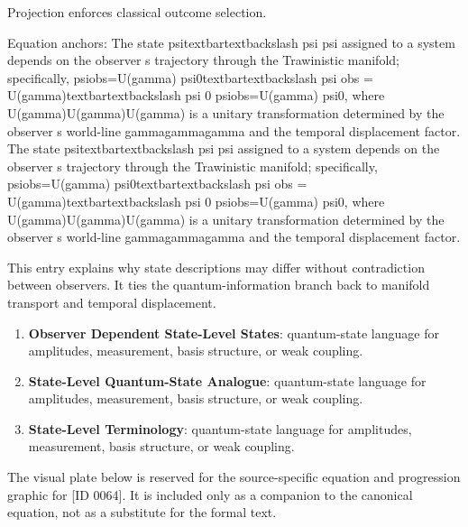 Projection enforces classical outcome selection.

Equation anchors: The state  psitextbartextbackslash psi psi assigned to a system depends on the observer s trajectory through the Trawinistic manifold; specifically,  psiobs=U(gamma) psi0textbartextbackslash psi obs = U(gamma)textbartextbackslash psi 0 psiobs=U(gamma) psi0, where U(gamma)U(gamma)U(gamma) is a unitary transformation determined by the observer s world-line gammagammagamma and the temporal displacement factor. The state  psitextbartextbackslash psi psi assigned to a system depends on the observer s trajectory through the Trawinistic manifold; specifically,  psiobs=U(gamma) psi0textbartextbackslash psi obs = U(gamma)textbartextbackslash psi 0 psiobs=U(gamma) psi0, where U(gamma)U(gamma)U(gamma) is a unitary transformation determined by the observer s world-line gammagammagamma and the temporal displacement factor.

This entry explains why state descriptions may differ without contradiction between observers. It ties the quantum-information branch back to manifold transport and temporal displacement.
\endgroup

\begingroup\footnotesize\sloppy
\begin{enumerate}[leftmargin=1.35em,itemsep=1pt,topsep=1pt,parsep=0pt]
\item \textbf{Observer Dependent State-Level States}: quantum-state language for amplitudes, measurement, basis structure, or weak coupling.
\item \textbf{State-Level Quantum-State Analogue}: quantum-state language for amplitudes, measurement, basis structure, or weak coupling.
\item \textbf{State-Level Terminology}: quantum-state language for amplitudes, measurement, basis structure, or weak coupling.
\end{enumerate}
\endgroup

\begingroup\footnotesize\sloppy
The visual plate below is reserved for the source-specific equation and progression graphic for [ID 0064]. It is included only as a companion to the canonical equation, not as a substitute for the formal text.
\par\endgroup
\ifTZPDarkEdition
{}
\fi


